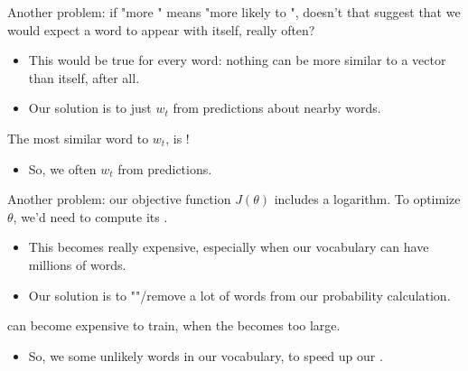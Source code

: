         Another problem: if "more " means "more likely to ", doesn't that suggest that we would expect a word to appear with itself, really often?

        \begin{itemize}
            \item This would be true for every word: nothing can be more similar to a vector than itself, after all.

            \item Our solution is to just  $w_t$ from predictions about nearby words.\\
        \end{itemize}

        \begin{concept}
            The most similar word to $w_t$, is !

            \begin{itemize}
                \item So, we often  $w_t$ from predictions.
            \end{itemize}
        \end{concept}


        Another problem: our objective function $J(\theta)$ includes a logarithm. To optimize $\theta$, we'd need to compute its .

        \begin{itemize}
            \item This becomes really expensive, especially when our vocabulary can have millions of words.

            \item Our solution is to ""/remove a lot of words from our probability calculation.
                \\
        \end{itemize}
            
        \begin{concept}
             can become expensive to train, when the  becomes too large.

            \begin{itemize}
                \item So, we  some unlikely words in our vocabulary, to speed up our .
            \end{itemize}
        \end{concept}